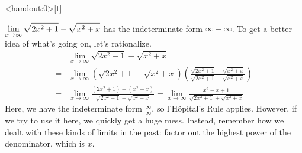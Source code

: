 \begin{frame}<handout:0>[t]

\pause



\color{answercolor}

$\displaystyle\lim_{x \to \infty}\sqrt{2x^2+1}-\sqrt{x^2+x}$ has the indeterminate form $\infty - \infty$. To get a better idea of what's going on, let's rationalize.
\begin{align*}
&\lim_{x \to \infty}\sqrt{2x^2+1}-\sqrt{x^2+x}\\
=&
\lim_{x \to \infty}\left(\sqrt{2x^2+1}-\sqrt{x^2+x}\right)\left(
\frac{\sqrt{2x^2+1}+\sqrt{x^2+x}}{\sqrt{2x^2+1}+\sqrt{x^2+x}}\right)\\
=&\lim_{x \to \infty}
\frac{(2x^2+1)-(x^2+x)}{\sqrt{2x^2+1}+\sqrt{x^2+x}}=
\lim_{x \to \infty}
\frac{x^2-x+1}{\sqrt{2x^2+1}+\sqrt{x^2+x}}
\end{align*}
Here, we have the indeterminate form $\frac{\infty}{\infty}$, so l'H\^opital's Rule applies. However, if we try to use it here, we quickly get a huge mess. Instead, remember how we dealt with these kinds of limits in the past: factor out the highest power of the denominator, which is $x$.
\end{frame}

